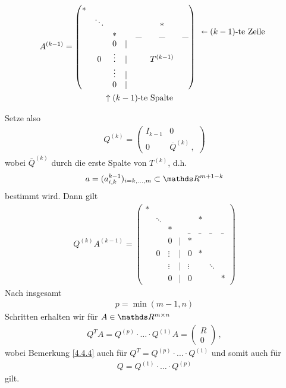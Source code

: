 \begin{Beme}
	\begin{align*}
	A^{(k-1)} &=
	\begin{pmatrix}
	*  &&&&&\\
	&\ddots &&&& * \\
	&&*&&\_&\_&\_ \\
	&&0&|&\\
	&0&\vdots&| &&T^{(k-1)}\\
	&&\vdots&  |\\
	&&0&  |
	\end{pmatrix}
	\begin{array}{l}
	\\
	\shortleftarrow (k-1) \text{-te Zeile} \\
	\\\\\\\\
	\end{array}\\
	&\phantom{= \, (} \begin{array}{ccl}
	~&~&~ \uparrow (k-1)\text{-te Spalte}
	\end{array}
	\end{align*}
	
	Setze also
	\begin{gather}
	Q^{(k)} = \begin{pmatrix}
	I_{k-1} & 0 \\
	0 & \overline{Q}^{(k)} \, ,
	\label{IV.4.13}
	\end{pmatrix}
	\end{gather}
	wobei $\overline{Q}^{(k)} $ durch die erste Spalte von $T^{(k)}$, d.h.
	\begin{gather}
	a= (a_{i,k}^{k-1})_{i=k,\dotsc, m} \subset \R^{m+1-k}
	\label{IV.4.14}
	\end{gather}
	bestimmt wird. Dann gilt
	\begin{gather*}
	Q^{(k)}A^{(k-1)} =
	\begin{pmatrix}
	*  &&&&&\\
	&\ddots &&&& * \\
	&&*&&\_&\_&\_&\_ \\
	&&0&|&* \\
	&0&\vdots&|&0&* \\
	&&\vdots&  |&\vdots &&\ddots\\
	&&0&  |&0&&&*
	\end{pmatrix}
	\end{gather*}
	Nach insgesamt 
	\begin{gather}
	p=\min (m-1, n)
	\label{IV.4.15}
	\end{gather}
	Schritten erhalten wir für $A\in \R^{m\times n}$
	\begin{gather}
	Q^TA = Q^{(p)}\cdot \dotsc \cdot Q^{(1)}A 
	= \begin{pmatrix} R\\0\end{pmatrix}\, ,
	\end{gather}
	wobei Bemerkung \ref{4.4.4} auch für 
	$Q^T= Q^{(p)}\cdot \dotsc \cdot Q^{(1)} $ und somit auch für
	\begin{gather}
	Q = Q^{(1)}\cdot \dotsc \cdot Q^{(p)}
	\label{IV.4.16}
	\end{gather}
	gilt.
\end{Beme}
